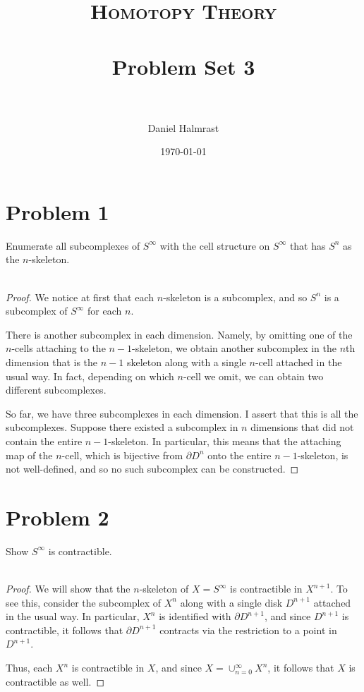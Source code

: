 \documentclass[fontsize=11pt]{scrartcl} %
\title{	
\normalfont \normalsize 
\textsc{Homotopy Theory} \\ [25pt] %
\horrule{0.5pt} \\[0.4cm] %
\huge Problem Set 3 \\ %
\horrule{2pt} \\[0.5cm] %
}
\author{Daniel Halmrast} %
\date{\normalsize\today} %
\numberwithin{equation}{section} %
\numberwithin{figure}{section} %
\numberwithin{table}{section} %
\begin{document}
\maketitle %

\section*{Problem 1} %
Enumerate all subcomplexes of $S^{\infty}$ with the cell structure on
$S^{\infty}$ that has $S^n$ as the $n$-skeleton.
\\
\\
\begin{proof}
    We notice at first that each $n$-skeleton is a subcomplex, and so $S^n$ is a
    subcomplex of $S^{\infty}$ for each $n$.

    There is another subcomplex in each dimension. Namely, by omitting one of
    the $n$-cells attaching to the $n-1$-skeleton, we obtain another subcomplex
    in the $n$th dimension that is the $n-1$ skeleton along with a single
    $n$-cell attached in the usual way. In fact, depending on which $n$-cell we
    omit, we can obtain two different subcomplexes.

    So far, we have three subcomplexes in each dimension. I assert that this is
    all the subcomplexes. Suppose there existed a subcomplex in $n$ dimensions
    that did not contain the entire $n-1$-skeleton. In particular, this means
    that the attaching map of the $n$-cell, which is bijective from $\partial
    D^n$ onto the entire
    $n-1$-skeleton, is not well-defined, and so no such subcomplex can be
    constructed.
\end{proof}


\section*{Problem 2} %
Show $S^{\infty}$ is contractible.
\\
\\
\begin{proof}
    We will show that the $n$-skeleton of $X=S^{\infty}$ is contractible in
    $X^{n+1}$. To see this, consider the subcomplex of $X^n$ along with a single
    disk $D^{n+1}$ attached in the usual way. In particular, $X^n$ is identified
    with $\partial D^{n+1}$, and since $D^{n+1}$ is contractible, it follows
    that $\partial D^{n+1}$ contracts via the restriction to a point in
    $D^{n+1}$.

    Thus, each $X^n$ is contractible in $X$, and since
    $X=\cup_{n=0}^{\infty}X^n$, it follows that $X$ is contractible as well.
\end{proof}
\end{document}
